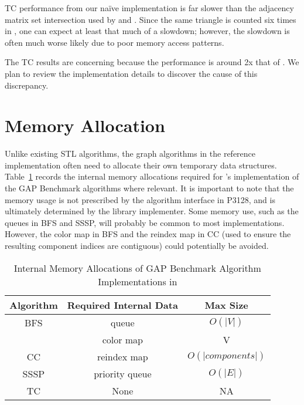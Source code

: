 TC performance from our na\"ive \bgl implementation
is far slower than the adjacency matrix set intersection used by \nwgraph
and \stdgraph.
Since the same triangle is counted six times in \bgl,
one can expect at least that much of a slowdown; however, the slowdown
is often much worse likely due to poor memory access patterns.

The TC results are concerning because the \stdgraph
performance is around 2x that of \nwgraph.
We plan to review the implementation details to discover the cause of
this discrepancy.  

\section{Memory Allocation}

Unlike existing STL algorithms, the graph algorithms in the \stdgraph reference
implementation often need to allocate their own temporary data structures.
Table~\ref{tab:internalmem} records the internal memory allocations
required for \stdgraph's implementation of the GAP Benchmark algorithms
where relevant.
It is important to note that the memory usage is not prescribed
by the algorithm interface in P3128, and is ultimately determined by the
library implementer.
Some memory use, such as the queues in BFS and SSSP, will
probably be common to most implementations.
However, the color map in BFS and the reindex map in CC
(used to ensure the resulting component indices are contiguous)
could potentially be avoided.

\begin{table}[h!]
\centering
\begin{tabular}{| c | c | c |}
\hline
Algorithm & Required Internal Data & Max Size \\\hline
BFS       & queue          & $O(|V|)$ \\
          & color map      & V \\\hline
CC        & reindex map    & $O(|components|)$ \\\hline
SSSP      & priority queue & $O(|E|)$\\\hline
TC        & None           & N\/A\\
\hline
\end{tabular}
\caption{Internal Memory Allocations of GAP Benchmark Algorithm Implementations in \stdgraph}
\label{tab:internalmem}
\end{table}
